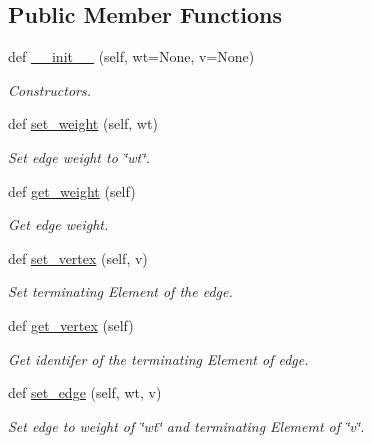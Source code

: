 \subsection*{Public Member Functions}
\begin{DoxyCompactItemize}
\item 
def \mbox{\hyperlink{classbridges_1_1edge_1_1_edge_ae4c776878bf887da35276ec1aa2a789d}{\+\_\+\+\_\+init\+\_\+\+\_\+}} (self, wt=None, v=None)
\begin{DoxyCompactList}\small\item\em Constructors. \end{DoxyCompactList}\item 
def \mbox{\hyperlink{classbridges_1_1edge_1_1_edge_ac8dfd60ebfa380ac02b6e9fd8bcb13a1}{set\+\_\+weight}} (self, wt)
\begin{DoxyCompactList}\small\item\em Set edge weight to \char`\"{}wt\char`\"{}. \end{DoxyCompactList}\item 
def \mbox{\hyperlink{classbridges_1_1edge_1_1_edge_a4ba1468a54909bf92ab3cd125f5929b3}{get\+\_\+weight}} (self)
\begin{DoxyCompactList}\small\item\em Get edge weight. \end{DoxyCompactList}\item 
def \mbox{\hyperlink{classbridges_1_1edge_1_1_edge_aba4adfc7164d409a02b8a65af9c5df50}{set\+\_\+vertex}} (self, v)
\begin{DoxyCompactList}\small\item\em Set terminating Element of the edge. \end{DoxyCompactList}\item 
def \mbox{\hyperlink{classbridges_1_1edge_1_1_edge_a1c1978781d77f24f76dbdd7dc95e8e9f}{get\+\_\+vertex}} (self)
\begin{DoxyCompactList}\small\item\em Get identifer of the terminating Element of edge. \end{DoxyCompactList}\item 
def \mbox{\hyperlink{classbridges_1_1edge_1_1_edge_a04f1233833cb134ee88a51d9e348450c}{set\+\_\+edge}} (self, wt, v)
\begin{DoxyCompactList}\small\item\em Set edge to weight of \char`\"{}wt\char`\"{} and terminating Elememt of \char`\"{}v\char`\"{}. \end{DoxyCompactList}\item 

\end{DoxyCompactItemize}
